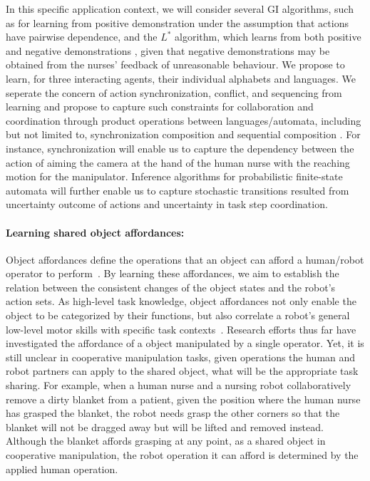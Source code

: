 \documentclass[letterpaper, 11 pt, onecolumn]{article}
\begin{document}
In this specific application context, we will consider several GI algorithms, such as \cite{heinz2013learning} for learning from positive demonstration under the assumption that actions have pairwise dependence, and the $L^\ast$ algorithm, which learns from both positive and negative demonstrations \cite{angluin1987learning}, given that negative demonstrations may be obtained from the nurses’ feedback of unreasonable behaviour. We propose to learn, for three interacting agents, their individual alphabets and languages. We seperate the concern of  action synchronization, conflict, and sequencing from learning and propose to capture such constraints for collaboration and coordination through product operations between languages/automata, including but not limited to, synchronization composition and sequential composition \cite{alur2015principles,hopcroft2001introduction}. 
For instance, synchronization will enable us to capture the dependency between the action of aiming the camera at the hand of the human nurse with the reaching motion for the manipulator.  Inference algorithms for probabilistic finite-state automata \cite{clark2004pac} \cite[Chap 12]{de2010grammatical} will further enable us to capture stochastic transitions resulted from uncertainty outcome of actions and uncertainty in task step coordination. 

\paragraph*{Learning shared object affordances:}
Object affordances define the operations that an object can afford a human/robot operator to perform~\cite{gibson2014ecological}. By learning these affordances, we aim to establish the relation between the consistent changes of the object states and the robot’s action sets. As high-level task knowledge, object affordances not only enable the object to be categorized by their functions, but also correlate a robot's general low-level motor skills with specific task contexts~\cite{fitzpatrick2003learning, veloso2005learning, thomaz2009learning,lopes2007affordance,montesano2008learning, lopes2010abstraction, kjellstrom2011visual,aksoy2011learning}. Research efforts thus far have investigated the affordance of a object manipulated by a single operator. Yet, it is still unclear in cooperative manipulation tasks, given operations the human and robot partners can apply to the shared object, what will be the appropriate task sharing. For example, when a human nurse and a nursing robot collaboratively remove a dirty blanket from a patient, given the position where the human nurse has grasped the blanket, the robot needs grasp the other corners so that the blanket will not be dragged away but will be lifted and removed instead. Although the blanket affords grasping at any point, as a shared object in cooperative manipulation, the robot operation it can afford is determined by the applied human operation. 
\end{document}
